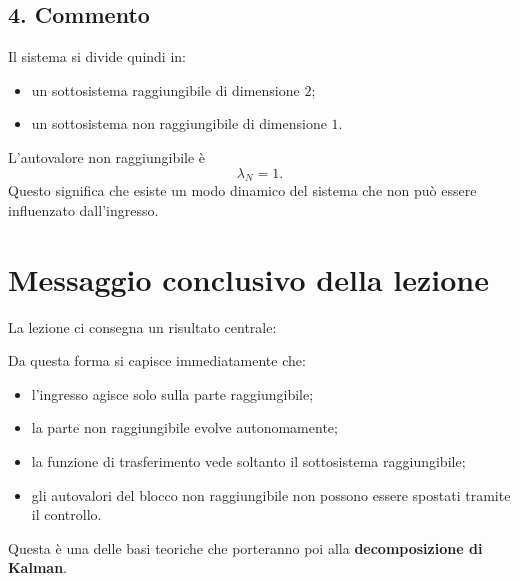 \subsection*{4. Commento}

Il sistema si divide quindi in:
\begin{itemize}
    \item un sottosistema raggiungibile di dimensione \(2\);
    \item un sottosistema non raggiungibile di dimensione \(1\).
\end{itemize}

L’autovalore non raggiungibile è
\[
\lambda_N=1.
\]
Questo significa che esiste un modo dinamico del sistema che non può essere influenzato dall’ingresso.

\section{Messaggio conclusivo della lezione}

La lezione ci consegna un risultato centrale:

\begin{center}
\end{center}

Da questa forma si capisce immediatamente che:
\begin{itemize}
    \item l’ingresso agisce solo sulla parte raggiungibile;
    \item la parte non raggiungibile evolve autonomamente;
    \item la funzione di trasferimento vede soltanto il sottosistema raggiungibile;
    \item gli autovalori del blocco non raggiungibile non possono essere spostati tramite il controllo.
\end{itemize}

Questa è una delle basi teoriche che porteranno poi alla \textbf{decomposizione di Kalman}.